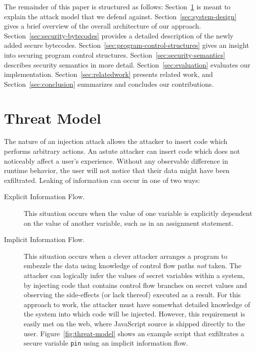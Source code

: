 \documentclass{llncs}
\begin{document}
The remainder of this paper is structured as follows:
Section~\ref{sec:threat-model} is meant to explain the attack model that we defend against.
Section~\ref{sec:system-design} gives a brief overview of the overall architecture of our approach.
Section~\ref{sec:security-bytecodes} provides a detailed description of the newly added secure bytecodes.
Section~\ref{sec:program-control-structures} gives an insight into securing program control structures.
Section~\ref{sec:security-semantics} describes security semantics in more detail.
Section~\ref{sec:evaluation} evaluates our implementation.
Section~\ref{sec:relatedwork} presents related work, and Section~\ref{sec:conclusion} summarizes and concludes our contributions.


\section{Threat Model}
\label{sec:threat-model}

The nature of an injection attack allows the attacker to insert code which performs arbitrary actions.
An astute attacker can insert code which does not noticeably affect a user's experience.
Without any observable difference in runtime behavior, the user will not notice that their data might have been exfiltrated.
Leaking of information can occur in one of two ways:
\begin{description}
 \item[Explicit Information Flow.]
 This situation occurs when the value of one variable is explicitly dependent on the value of another variable, such as in an assignment statement.
 \item[Implicit Information Flow.]
 This situation occurs when a clever attacker arranges a program to embezzle the data using knowledge of control flow paths \emph{not} taken.
 The attacker can logically infer the values of secret variables within a system, by injecting code that contains control flow branches on secret values and observing the side-effects (or lack thereof) executed as a result.
 For this approach to work, the attacker must have somewhat detailed knowledge of the system into which code will be injected.
 However, this requirement is easily met on the web, where JavaScript source is shipped directly to the user.
 Figure~\ref{fig:threat-model} shows an example script that exfiltrates a secure variable \texttt{pin} using an implicit information flow.
\end{description}
\end{document}
